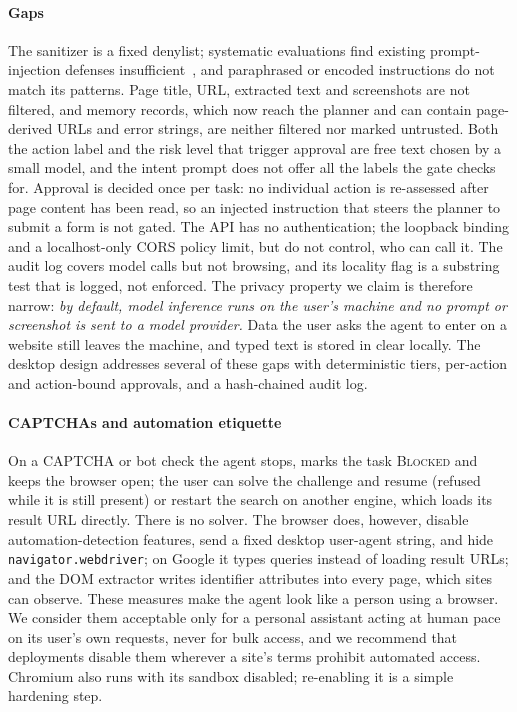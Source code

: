 \paragraph{Gaps} The sanitizer is a fixed denylist; systematic evaluations find existing prompt-injection defenses insufficient~\cite{liu2024formalizing}, and paraphrased or encoded instructions do not match its patterns. Page title, URL, extracted text and screenshots are not filtered, and memory records, which now reach the planner and can contain page-derived URLs and error strings, are neither filtered nor marked untrusted. Both the action label and the risk level that trigger approval are free text chosen by a small model, and the intent prompt does not offer all the labels the gate checks for. Approval is decided once per task: no individual action is re-assessed after page content has been read, so an injected instruction that steers the planner to submit a form is not gated. The API has no authentication; the loopback binding and a localhost-only CORS policy limit, but do not control, who can call it. The audit log covers model calls but not browsing, and its locality flag is a substring test that is logged, not enforced. The privacy property we claim is therefore narrow: \emph{by default, model inference runs on the user's machine and no prompt or screenshot is sent to a model provider.} Data the user asks the agent to enter on a website still leaves the machine, and typed text is stored in clear locally. The desktop design addresses several of these gaps with deterministic tiers, per-action and action-bound approvals, and a hash-chained audit log.

\paragraph{CAPTCHAs and automation etiquette} On a CAPTCHA or bot check the agent stops, marks the task \textsc{Blocked} and keeps the browser open; the user can solve the challenge and resume (refused while it is still present) or restart the search on another engine, which loads its result URL directly. There is no solver. The browser does, however, disable automation-detection features, send a fixed desktop user-agent string, and hide \texttt{navigator.webdriver}; on Google it types queries instead of loading result URLs; and the DOM extractor writes identifier attributes into every page, which sites can observe. These measures make the agent look like a person using a browser. We consider them acceptable only for a personal assistant acting at human pace on its user's own requests, never for bulk access, and we recommend that deployments disable them wherever a site's terms prohibit automated access. Chromium also runs with its sandbox disabled; re-enabling it is a simple hardening step.
